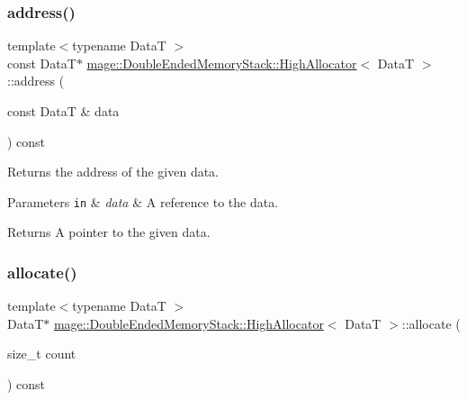 \subsubsection{\texorpdfstring{address()}{address()}\hspace{0.1cm}{\footnotesize\ttfamily [2/2]}}
{\footnotesize\ttfamily template$<$typename DataT $>$ \\
const DataT$\ast$ \hyperlink{structmage_1_1_double_ended_memory_stack_1_1_high_allocator}{mage\+::\+Double\+Ended\+Memory\+Stack\+::\+High\+Allocator}$<$ DataT $>$\+::address (\begin{DoxyParamCaption}\item[{const DataT \&}]{data }\end{DoxyParamCaption}) const\hspace{0.3cm}{\ttfamily [noexcept]}}

Returns the address of the given data.


\begin{DoxyParams}[1]{Parameters}
\mbox{\tt in}  & {\em data} & A reference to the data. \\
\hline
\end{DoxyParams}
\begin{DoxyReturn}{Returns}
A pointer to the given data. 
\end{DoxyReturn}
\hypertarget{structmage_1_1_double_ended_memory_stack_1_1_high_allocator_ab6585eebb7bb11dcee1945b11b50ea98}{}\label{structmage_1_1_double_ended_memory_stack_1_1_high_allocator_ab6585eebb7bb11dcee1945b11b50ea98} 
\subsubsection{\texorpdfstring{allocate()}{allocate()}\hspace{0.1cm}{\footnotesize\ttfamily [1/2]}}
{\footnotesize\ttfamily template$<$typename DataT $>$ \\
DataT$\ast$ \hyperlink{structmage_1_1_double_ended_memory_stack_1_1_high_allocator}{mage\+::\+Double\+Ended\+Memory\+Stack\+::\+High\+Allocator}$<$ DataT $>$\+::allocate (\begin{DoxyParamCaption}\item[{size\+\_\+t}]{count }\end{DoxyParamCaption}) const}

